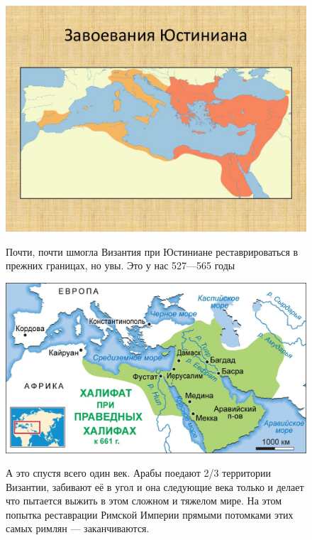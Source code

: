 \begin{figure}[h!tb]
	\centering\includegraphics[scale=0.4]{Relig_gambit/15729324551801232.png}
	\label{fig:gambit9} %
	\caption{Почти, почти шмогла Византия при Юстиниане реставрироваться в прежних границах, но увы. Это у нас 527—565 годы	}
\end{figure}
\begin{figure}[h!tb]
	\centering\includegraphics[scale=0.4]{Relig_gambit/1572932481163266824.png}
	\label{fig:gambit10} %
	\caption{А это спустя всего один век. Арабы поедают 2/3 территории Византии, забивают её в угол и она следующие века только и делает что пытается выжить в этом сложном и тяжелом мире. На этом попытка реставрации Римской Империи прямыми потомками этих самых римлян — заканчиваются.	}
\end{figure}

